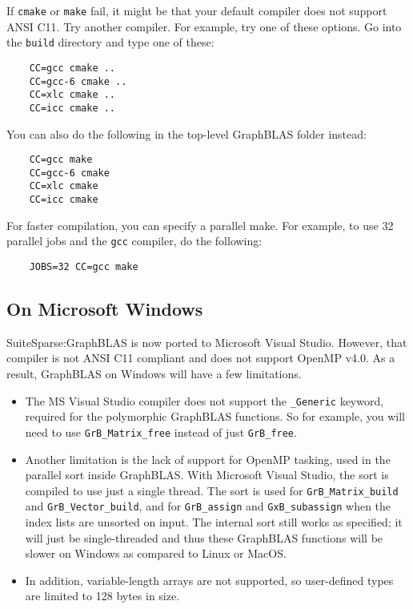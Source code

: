 \documentclass[12pt]{article}
\begin{document}
If \verb'cmake' or \verb'make' fail, it might be that your default compiler
does not support ANSI C11.  Try another compiler.  For example, try one of
these options.  Go into the \verb'build' directory and type one of these:

    {\small
    \begin{verbatim}
    CC=gcc cmake ..
    CC=gcc-6 cmake ..
    CC=xlc cmake ..
    CC=icc cmake ..  \end{verbatim} }

You can also do the following in the top-level GraphBLAS folder instead:

    {\small
    \begin{verbatim}
    CC=gcc make
    CC=gcc-6 cmake
    CC=xlc cmake
    CC=icc cmake \end{verbatim} }

For faster compilation, you can specify a parallel make.  For example,
to use 32 parallel jobs and the \verb'gcc' compiler, do the following:

    {\small
    \begin{verbatim}
    JOBS=32 CC=gcc make \end{verbatim} }

\subsection{On Microsoft Windows}
\label{sec:windows}

SuiteSparse:GraphBLAS is now ported to Microsoft Visual Studio.  However, that
compiler is not ANSI C11 compliant and does not support OpenMP v4.0.  As a
result, GraphBLAS on Windows will have a few limitations.

\begin{itemize}

\item The MS Visual Studio compiler does not support the \verb'_Generic'
keyword, required for the polymorphic GraphBLAS functions.  So for example, you
will need to use \verb'GrB_Matrix_free' instead of just \verb'GrB_free'.

\item Another limitation is the lack of support for OpenMP tasking, used in the
parallel sort inside GraphBLAS.  With Microsoft Visual Studio, the sort is
compiled to use just a single thread.  The sort is used for
\verb'GrB_Matrix_build' and \verb'GrB_Vector_build', and for \verb'GrB_assign'
and  \verb'GxB_subassign' when the index lists are unsorted on input.  The
internal sort still works as specified; it will just be single-threaded and
thus these GraphBLAS functions will be slower on Windows as compared to Linux
or MacOS.

\item In addition, variable-length arrays are not supported, so user-defined
types are limited to 128 bytes in size.
\end{itemize}
\end{document}
